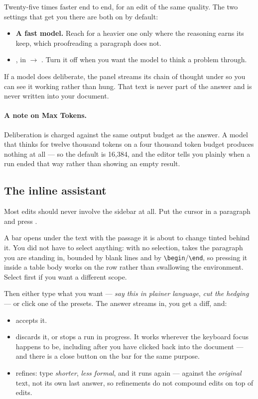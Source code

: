 Twenty-five times faster end to end, for an edit of the same quality. The two
settings that get you there are both on by default:

\begin{itemize}[leftmargin=*]
  \item \textbf{A fast model.} Reach for a heavier one only where the reasoning
        earns its keep, which proofreading a paragraph does not.
  \item \textbf{}, in
         $\rightarrow$ . Turn it off when you want the
        model to think a problem through.
\end{itemize}

If a model does deliberate, the panel streams its chain of thought under
 so you can see it working rather than hung. That text is never
part of the answer and is never written into your document.

\paragraph{A note on Max Tokens.}
Deliberation is charged against the same output budget as the answer. A model
that thinks for twelve thousand tokens on a four thousand token budget produces
nothing at all --- so the default is 16{,}384, and the editor tells you plainly
when a run ended that way rather than showing an empty result.

\subsection{The inline assistant}
\label{sec:inline}

Most edits should never involve the sidebar at all. Put the cursor in a
paragraph and press .

A bar opens under the text with the passage it is about to change tinted behind
it. You did not have to select anything: with no selection,  takes
the paragraph you are standing in, bounded by blank lines and by
\verb|\begin|/\verb|\end|, so pressing it inside a table body works on the row
rather than swallowing the environment. Select first if you want a different
scope.

Then either type what you want --- \emph{say this in plainer language},
\emph{cut the hedging} --- or click one of the presets. The answer streams in,
you get a diff, and:

\begin{itemize}[leftmargin=*]
  \item {} accepts it.
  \item {} discards it, or stops a run in progress. It works wherever
        the keyboard focus happens to be, including after you have clicked back
        into the document --- and there is a close button on the bar for the
        same purpose.
  \item {} refines: type \emph{shorter}, \emph{less formal}, and it
        runs again --- against the \emph{original} text, not its own last
        answer, so refinements do not compound edits on top of edits.
\end{itemize}

